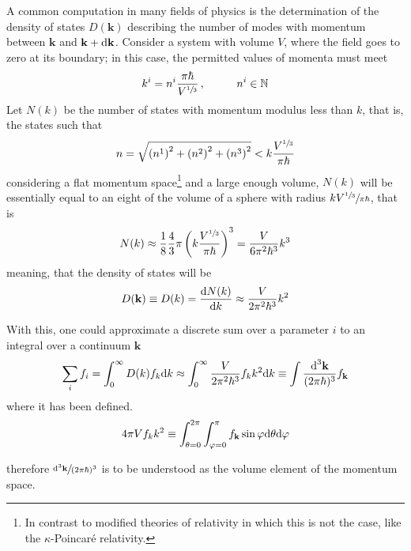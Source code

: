 A common computation in many fields of physics is the determination of the density of states $D(\mathbf{k})$ describing the number of modes with momentum between $\mathbf{k}$ and $\mathbf{k}+\text{d} \mathbf{k}$. Consider a system with volume $V$, where the field goes to zero at its boundary; in this case, the permitted values of momenta must meet
\begin{equation}
	k^i=n^i\frac{\pi\hbar}{V^{\sfrac{1}{3}}}\,,\hspace{1.0cm}n^i\in\mathbb{N}
\end{equation}
Let $N(k)$ be the number of states with momentum modulus less than $k$, that is, the states such that
\begin{equation}
	n=\sqrt{\left(n^1\right)^2+\left(n^2\right)^2+\left(n^3\right)^2}<k\frac{V^{\sfrac{1}{3}}}{\pi\hbar}
\end{equation}
considering a flat momentum space\footnote{In contrast to modified theories of relativity in which this is not the case, like the $\kappa$-Poincaré relativity.} and a large enough volume, $N(k)$ will be essentially equal to an eight of the volume of a sphere with radius $kV^{\sfrac{1}{3}}\sfrac{}{\pi\hbar}$, that is
\begin{equation}
	N(k)\approx\frac{1}{8}\frac{4}{3}\pi\left(k\frac{V^{\sfrac{1}{3}}}{\pi\hbar}\right)^3=\frac{V}{6\pi^2\hbar^3}k^3
\end{equation} 
meaning, that the density of states will be
\begin{equation}
	D(\mathbf{k})\equiv D(k)=\frac{\text{d} N(k)}{\text{d} k}\approx\frac{V}{2\pi^2\hbar^3}k^2
\end{equation}

With this, one could approximate a discrete sum over a parameter $i$ to an integral over a continuum $\mathbf{k}$
\begin{equation}
	\sum_i f_i=\int_0^\infty D(k)f_k\text{d} k\approx\int_0^\infty\frac{V}{2\pi^2\hbar^3} f_k k^2\text{d} k\equiv\int\frac{\text{d}^3\mathbf{k}}{(2\pi\hbar)^3}f_\mathbf{k}
\end{equation}
where it has been defined.
\begin{equation}
	4\pi V f_k k^2\equiv \int_{\theta=0}^{2\pi}\int_{\varphi=0}^\pi f_\mathbf{k}\sin\varphi \text{d}\theta\text{d}\varphi
\end{equation}

therefore $\sfrac{\text{d}^3\mathbf{k}}{(2\pi\hbar)^3}$ is to be understood as the volume element of the momentum space.
